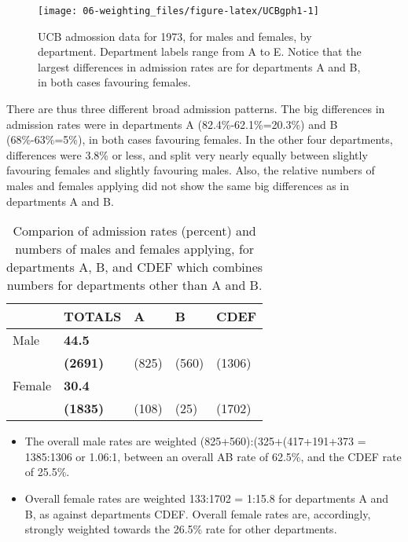 \documentclass[
  10ptls,
  b5paper]{book}
\providecommand{\tightlist}{%
  \setlength{\itemsep}{0pt}\setlength{\parskip}{0pt}}
\begin{document}
\begin{figure}[H]

{\centering \texttt{[image: 06-weighting\_files/figure-latex/UCBgph1-1]} 

}

\caption{UCB admossion data for 1973, for males and females, by 
department.  Department labels range from A to E.  Notice that
the largest differences in admission rates are for departments
A and B, in both cases favouring females.}\label{fig:UCBgph1}
\end{figure}

There are thus three different broad admission patterns. The big differences in admission rates were in departments A (82.4\%-62.1\%=20.3\%) and B (68\%-63\%=5\%), in both cases favouring females. In the other four departments, differences were 3.8\% or less, and split very nearly equally between slightly favouring females and slightly favouring males. Also, the relative numbers of males and females applying did not show the same big differences as in departments A and B.

\begin{table}[H]
\centering
\caption{Comparion of admission rates (percent) and numbers of males and
females applying, for departments A, B, and CDEF which combines 
numbers for departments other than A and B.}
\centering
\begin{tabular}[t]{l>{\raggedleft\arraybackslash}p{5em}>{\raggedleft\arraybackslash}p{2.25em}>{\raggedleft\arraybackslash}p{2.25em}>{\raggedleft\arraybackslash}p{2.25em}}
\toprule
  & TOTALS & A & B & CDEF\\
\midrule
Male & \textbf{44.5} & 62.1 & 63 & 25.5\\
 & \textbf{(2691)} & (825) & (560) & (1306)\\
Female & \textbf{30.4} & 82.4 & 68 & 26.5\\
 & \textbf{(1835)} & (108) & (25) & (1702)\\
\bottomrule
\end{tabular}
\end{table}

\begin{itemize}
\tightlist
\item
  The overall male rates are weighted (825+560):(325+(417+191+373 = 1385:1306 or 1.06:1, between an overall AB rate of 62.5\%, and the CDEF rate of 25.5\%.\\
\item
  Overall female rates are weighted 133:1702 = 1:15.8 for departments A and B, as against departments CDEF. Overall female rates are, accordingly, strongly weighted towards the 26.5\% rate for other departments.
\end{itemize}
\end{document}
